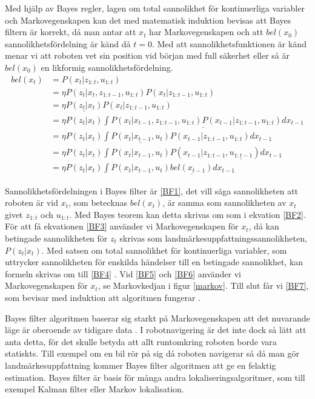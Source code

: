 Med hjälp av Bayes regler, lagen om total sannolikhet för kontinuerliga variabler och Markovegenskapen kan det med matematisk induktion bevisas att Bayes filtern är korrekt, då man antar att $x_t$ har Markovegenskapen och att $bel(x_0)$ sannolikhetsfördelning är känd då $t = 0$. Med att sannolikhetsfunktionen är känd menar vi att roboten vet sin position vid början med full säkerhet eller så är $bel(x_0)$ en likformig sannolikhetsfördelning.
\begin{align}
bel(x_t) & = P(x_t | z_{1:t}, u_{1:t}) \tag{BF1}\label{BF1} \\
        & = \eta P(z_t | x_t, z_{1:t-1}, u_{1:t}) P(x_t | z_{1:t-1}, u_{1:t}) \tag{BF2}\label{BF2}\\
        & = \eta \underline{P(z_t | x_t)} P(x_t | z_{1:t-1}, u_{1:t}) \tag{BF3}\label{BF3}\\
        & = \eta P(z_t | x_t) \underline{\int P(x_t | x_{t-1}, z_{1:t-1}, u_{1:t}) P(x_{t-1} | z_{1:t-1}, u_{1:t}) dx_{t-1}} \tag{BF4}\label{BF4}\\
        & = \eta P(z_t | x_t) \int \underline{P(x_t | x_{t-1}, u_t)} P(x_{t-1} | z_{1:t-1}, u_{1:t}) dx_{t-1} \tag{BF5}\label{BF5}\\
        & = \eta P(z_t | x_t) \int P(x_t | x_{t-1}, u_t) P(x_{t-1} | z_{1:t-1}, \underline{u_{1:t-1}}) dx_{t-1} \tag{BF6}\label{BF6}\\
        & = \eta P(z_t | x_t) \int P(x_t | x_{t-1}, u_t) \underline{bel(x_{t-1})} dx_{t-1} \tag{BF7}\label{BF7}
\end{align}

Sannolikhetsfördelningen i Bayes filter är \ref{BF1}, det vill säga sannolikheten att roboten är vid $x_t$, som betecknas $bel(x_t)$, är samma som sannolikheten av $x_t$ givet $z_{1:t}$ och $u_{1:t}$. Med Bayes teorem kan detta skrivas om som i ekvation \ref{BF2}. För att få ekvationen \ref{BF3} använder vi Markovegenskapen för $x_t$, då kan betingade sannolikheten för $z_t$ skrivas som landmärkesuppfattningssannolikheten, $P(z_t|x_t)$. Med satsen om total sannolikhet för kontinuerliga variabler, som uttrycker sannolikheten för enskilda händelser till en betingade sannolikhet, kan formeln skrivas om till \ref{BF4} \citep[Kapitel~2.2]{ProbabilisticRobotics}. Vid \ref{BF5} och \ref{BF6} använder vi Markovegenskapen för $x_t$, se Markovkedjan i figur \ref{markov}. Till slut får vi \ref{BF7}, som bevisar med induktion att algoritmen fungerar \citep{ProbabilisticRobotics}.

Bayes filter algoritmen baserar sig starkt på Markovegenskapen att det nuvarande läge är oberoende av tidigare data \citep{ProbabilisticRobotics}. I robotnavigering är det inte dock så lätt att anta detta, för det skulle betyda att allt runtomkring roboten borde vara statiskts. Till exempel om en bil rör på sig då roboten navigerar så då man gör landmärkesuppfattning kommer Bayes filter algoritmen att ge en felaktig estimation. Bayes filter är basis för många andra lokaliseringsalgoritmer, som till exempel Kalman filter eller Markov lokalisation. 

